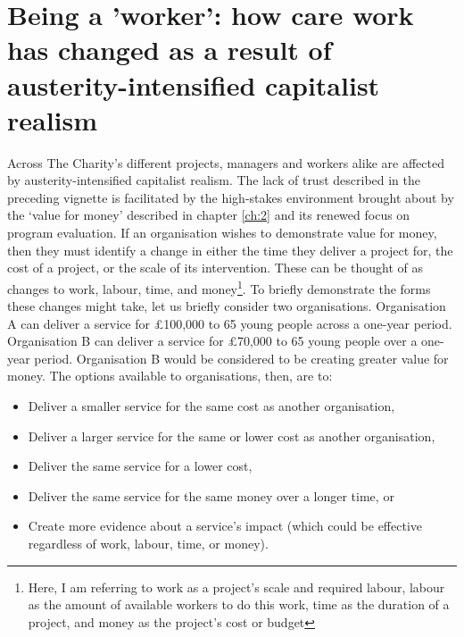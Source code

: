 \section{Being a 'worker': how care work has changed as a result of austerity-intensified capitalist realism}
Across The Charity's different projects, managers and workers alike are affected by austerity-intensified capitalist realism. The lack of trust described in the preceding vignette is facilitated by the high-stakes environment brought about by the ‘value for money’ described in chapter \ref{ch:2} and its renewed focus on program evaluation. If an organisation wishes to demonstrate value for money, then they must identify a change in either the time they deliver a project for, the cost of a project, or the scale of its intervention. These can be thought of as changes to work, labour, time, and money\footnote{Here, I am referring to work as a project's scale and required labour, labour as the amount of available workers to do this work, time as the duration of a project, and money as the project's cost or budget}. To briefly demonstrate the forms these changes might take, let us briefly consider two organisations. Organisation A can deliver a service for £100,000 to 65 young people across a one-year period. Organisation B can deliver a service for £70,000 to 65 young people over a one-year period. Organisation B would be considered to be creating greater value for money. The options available to organisations, then, are to:
\begin{itemize}
\item Deliver a smaller service for the same cost as another organisation,
\item Deliver a larger service for the same or lower cost as another organisation,
\item Deliver the same service for a lower cost, 
\item Deliver the same service for the same money over a longer time, or
\item Create more evidence about a service's impact (which could be effective regardless of work, labour, time, or money).
\end{itemize}


